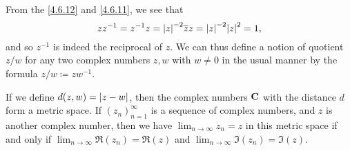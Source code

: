 \begin{note}
  From the \cref{4.6.12} and \cref{4.6.11}, we see that
  \[
    z z^{-1} = z^{-1} z = \abs{z}^{-2} \overline{z} z = \abs{z}^{-2} \abs{z}^2 = 1,
  \]
  and so \(z^{-1}\) is indeed the reciprocal of \(z\).
  We can thus define a notion of quotient \(z / w\) for any two complex numbers \(z, w\) with \(w \neq 0\) in the usual manner by the formula \(z / w \coloneqq z w^{-1}\).
\end{note}

\begin{lemma}\label{4.6.13}
  If we define \(d(z, w) = \left\lvert z - w\right\rvert\), then the complex numbers \(\mathbf{C}\) with the distance \(d\) form a metric space.
  If \((z_n)_{n = 1}^\infty\) is a sequence of complex numbers, and \(z\) is another complex number, then we have \(\lim_{n \to \infty} z_n = z\) in this metric space if and only if \(\lim_{n \to \infty} \Re(z_n) = \Re(z)\) and \(\lim_{n \to \infty} \Im(z_n) = \Im(z)\).
\end{lemma}

